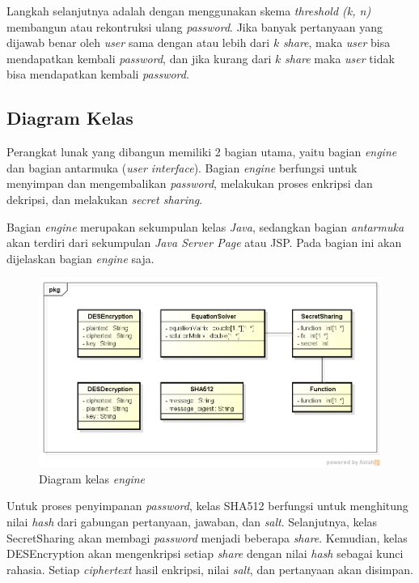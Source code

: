 Langkah selanjutnya adalah dengan menggunakan skema \textit{threshold (k, n)} membangun atau rekontruksi ulang \textit{password}. Jika banyak pertanyaan yang dijawab benar oleh \textit{user} sama dengan atau lebih dari \begin{math}k\end{math} \textit{share}, maka \textit{user} bisa mendapatkan kembali \textit{password}, dan jika kurang dari \begin{math}k\end{math} \textit{share} maka \textit{user} tidak bisa mendapatkan kembali \textit{password}.

\subsection{Diagram Kelas}

Perangkat lunak yang dibangun memiliki 2 bagian utama, yaitu bagian \textit{engine} dan bagian antarmuka (\textit{user interface}). Bagian \textit{engine} berfungsi untuk menyimpan dan mengembalikan \textit{password}, melakukan proses enkripsi dan dekripsi, dan melakukan \textit{secret sharing}.

Bagian \textit{engine} merupakan sekumpulan kelas \textit{Java}, sedangkan bagian \textit{antarmuka} akan terdiri dari sekumpulan \textit{Java Server Page} atau JSP. Pada bagian ini akan dijelaskan bagian \textit{engine} saja.

\begin{figure}[H]
	\centerline{\includegraphics[scale=0.6]{Gambar/engine-class-diagram}}
	\label{fig:reconstruct-secret}
	\caption{Diagram kelas \textit{engine}}
\end{figure}

Untuk proses penyimpanan \textit{password}, kelas SHA512 berfungsi untuk menghitung nilai \textit{hash} dari gabungan pertanyaan, jawaban, dan \textit{salt}. Selanjutnya, kelas SecretSharing akan membagi \textit{password} menjadi beberapa \textit{share}. Kemudian, kelas DESEncryption akan mengenkripsi setiap \textit{share} dengan nilai \textit{hash} sebagai kunci rahasia. Setiap \textit{ciphertext} hasil enkripsi, nilai \textit{salt}, dan pertanyaan akan disimpan.

